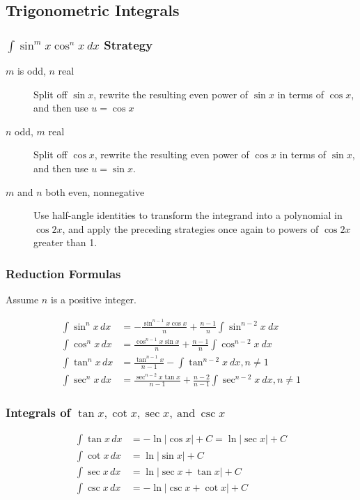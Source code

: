 \subsection{Trigonometric Integrals}
\subsubsection{$\int \sin^m x \cos^n x \ dx$ Strategy}
\begin{description}
\item [$m$ is odd, $n$ real] Split off $\sin x$, rewrite the resulting even power of $\sin x$ in terms of $\cos x$, and then use $u = \cos x$
\item [$n$ odd, $m$ real] Split off $\cos x$, rewrite the resulting even power of $\cos x$ in terms of $\sin x$, and then use $u = \sin x$.
\item [$m$ and $n$ both even, nonnegative] Use half-angle identities to transform the integrand into a polynomial in $\cos 2x$, and apply the preceding strategies once again to powers of $\cos 2x$ greater than 1.
\end{description}

\subsubsection{Reduction Formulas}
Assume $n$ is a positive integer.

\begin{align}
\int \sin^n x \, dx &= -\frac{\sin^{n - 1}x \cos x}{n} + \frac{n - 1}{n} \int \sin^{n-2}x \ dx \\
\int \cos^n x \, dx &= \frac{\cos^{n - 1}x \sin x}{n} + \frac{n - 1}{n} \int \cos^{n - 2} x \ dx \\
\int \tan ^n x \, dx &= \frac{\tan^{n - 1}x}{n - 1} - \int \tan^{n - 2}x \ dx, n \neq 1 \\
\int \sec ^n x \, dx &= \frac{\sec^{n - 2}x \tan x}{n - 1} + \frac{n - 2}{n - 1} \int \sec^{n - 2} x \ dx, n \neq 1
\end{align}

\subsubsection{Integrals of $\tan x, \cot x, \sec x, \ \text{and} \ \csc x$}
\begin{align}
\int \tan x \, dx &= - \ln |\cos x| + C = \ln | \sec x | + C \\
\int \cot x \, dx &= \ln | \sin x | + C \\
\int \sec x \, dx &= \ln | \sec x + \tan x| + C \\
\int \csc x \, dx &= - \ln | \csc x + \cot x | + C
\end{align}

